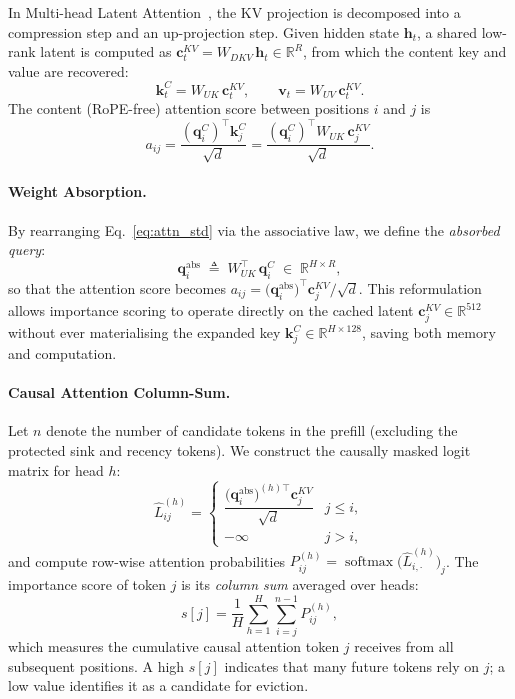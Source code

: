 \documentclass[letterpaper]{article} %
\begin{document}
In Multi-head Latent Attention~\cite{deepseekv2}, the KV projection is
decomposed into a compression step and an up-projection step.
Given hidden state $\mathbf{h}_t$, a shared low-rank latent is computed as
$\mathbf{c}_t^{KV} = W_{DKV}\,\mathbf{h}_t \in \mathbb{R}^{R}$,
from which the content key and value are recovered:
\begin{equation}
  \mathbf{k}_t^C = W_{UK}\,\mathbf{c}_t^{KV},
  \qquad
  \mathbf{v}_t   = W_{UV}\,\mathbf{c}_t^{KV}.
\end{equation}
The content (RoPE-free) attention score between positions $i$ and $j$ is
\begin{equation}
  a_{ij}
  = \frac{(\mathbf{q}_i^C)^\top \mathbf{k}_j^C}{\sqrt{d}}
  = \frac{(\mathbf{q}_i^C)^\top W_{UK}\,\mathbf{c}_j^{KV}}{\sqrt{d}}.
  \label{eq:attn_std}
\end{equation}

\paragraph{Weight Absorption.}
By rearranging Eq.~\eqref{eq:attn_std} via the associative law, we define the
\emph{absorbed query}:
\begin{equation}
  \mathbf{q}_i^{\mathrm{abs}}
  \;\triangleq\; W_{UK}^\top\,\mathbf{q}_i^C
  \;\in\; \mathbb{R}^{H \times R},
  \label{eq:qabs}
\end{equation}
so that the attention score becomes
$a_{ij} = \bigl(\mathbf{q}_i^{\mathrm{abs}}\bigr)^\top \mathbf{c}_j^{KV}\!/\sqrt{d}$.
This reformulation allows importance scoring to operate directly on the cached
latent $\mathbf{c}_j^{KV} \in \mathbb{R}^{512}$ without ever materialising
the expanded key $\mathbf{k}_j^C \in \mathbb{R}^{H \times 128}$,
saving both memory and computation.

\paragraph{Causal Attention Column-Sum.}
Let $n$ denote the number of candidate tokens in the prefill
(excluding the protected sink and recency tokens).
We construct the causally masked logit matrix for head $h$:
\begin{equation}
  \hat{L}_{ij}^{(h)} =
  \begin{cases}
    \dfrac{\bigl(\mathbf{q}_i^{\mathrm{abs}}\bigr)^{(h)\top}
           \mathbf{c}_j^{KV}}{\sqrt{d}}
    & j \le i,\\[6pt]
    -\infty & j > i,
  \end{cases}
  \label{eq:logit}
\end{equation}
and compute row-wise attention probabilities
$P_{ij}^{(h)} = \operatorname{softmax}\!\bigl(\hat{L}_{i,\cdot}^{(h)}\bigr)_j$.
The importance score of token $j$ is its \emph{column sum} averaged over heads:
\begin{equation}
  s[j]
  = \frac{1}{H}\sum_{h=1}^{H}\sum_{i=j}^{n-1} P_{ij}^{(h)},
  \label{eq:colsum}
\end{equation}
which measures the cumulative causal attention token $j$ receives from all
subsequent positions.  A high $s[j]$ indicates that many future tokens rely
on $j$; a low value identifies it as a candidate for eviction.
\end{document}
